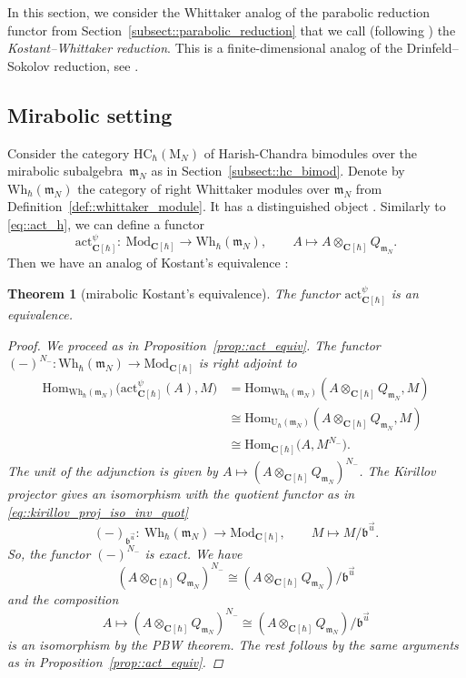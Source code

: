 \documentclass[10pt,a4paper]{article}
\numberwithin{equation}{section}
\newtheorem{Theorem}{Theorem}[section]
\newcommand{\C}{\mathbf{C}}
\newcommand{\U}{\mathrm{U}_{\hbar}}
\newcommand{\rM}{\mathrm{M}}
\renewcommand{\b}{\mathfrak{b}}
\newcommand{\n}{\mathfrak{n}}
\newcommand{\m}{\mathfrak{m}}
\newcommand{\Wh}{\mathrm{Wh}_{\hbar}}
\newcommand{\act}{\mathrm{act}}
\newcommand{\Mod}[1]{{\mathrm{Mod}}_{#1}}
\newcommand{\HC}{\mathrm{HC}_{\hbar}}
\newcommand{\Hom}{\mathrm{Hom}}
\begin{document}
	In this section, we consider the Whittaker analog of the parabolic reduction functor from Section~\ref{subsect::parabolic_reduction} that we call (following \cite{BezrukavnikovFinkelberg}) the \emph{Kostant--Whittaker reduction}. This is a finite-dimensional analog of the Drinfeld--Sokolov reduction, see \cite{Arakawa}.
	
	\subsection{Mirabolic setting} Consider the category $\HC(\rM_N)$ of Harish-Chandra bimodules over the mirabolic subalgebra~$\m_N$ as in Section~\ref{subsect::hc_bimod}. Denote by $\Wh(\m_N)$ the category of right Whittaker modules over $\m_N$ from Definition~\ref{def::whittaker_module}. It has a distinguished object \smash{$Q_{\m_N} = \n_-^{\psi} \backslash \U(\m_N)$}. Similarly to \eqref{eq::act_h}, we can define a functor
	\begin{equation*}
		\act_{\C[\hbar]}^{\psi} \colon\ \Mod{\C[\hbar]} \rightarrow \Wh(\m_N), \qquad A \mapsto A \otimes_{\C[\hbar]} Q_{\m_N}.
	\end{equation*}
	Then we have an analog of Kostant's equivalence \cite{Kostant}:
	\begin{Theorem}[mirabolic Kostant's equivalence]
		\label{thm::mirabolic_skryabin}
		The functor $\act_{\C[\hbar]}^{\psi}$ is an equivalence.
		\begin{proof}
			We proceed as in Proposition~\ref{prop::act_equiv}. The functor $(-)^{N_-} \colon \Wh(\m_N) \rightarrow \Mod{\C[\hbar]}$ is right adjoint to \smash{$\act_{\C[\hbar]}^{\psi}$}
			\begin{align*}
				\Hom_{\Wh(\m_N)} \bigl(\act_{\C[\hbar]}^{\psi}(A), M\bigr) &= \Hom_{\Wh(\m_N)}(A \otimes_{\C[\hbar]} Q_{\m_N},M) \\
				&\cong \Hom_{\U(\m_N)} (A \otimes_{\C[\hbar]} Q_{\m_N},M) \\
				&\cong \Hom_{\C[\hbar]}\bigl(A,M^{N_-}\bigr).
			\end{align*}
			The unit of the adjunction is given by
$
			A \mapsto (A \otimes_{\C[\hbar]} Q_{\m_N})^{N_-}$.
			The Kirillov projector gives an isomorphism with the quotient functor as in \eqref{eq::kirillov_proj_iso_inv_quot}
			\[
			(-)_{\b^{\vec{u}}}\colon\ \Wh(\m_N) \rightarrow \Mod{\C[\hbar]}, \qquad M \mapsto M/\b^{\vec{u}}.
			\]
			So, the functor $(-)^{N_-}$ is exact. We have
			\[
			(A \otimes_{\C[\hbar]} Q_{\m_N})^{N_-} \cong (A \otimes_{\C[\hbar]} Q_{\m_N})/ \b^{\vec{u}}
			\]
			and the composition
			\[
			A \mapsto (A \otimes_{\C[\hbar]} Q_{\m_N})^{N_-} \cong (A \otimes_{\C[\hbar]} Q_{\m_N})/ \b^{\vec{u}}
			\]
			is an isomorphism by the PBW theorem. The rest follows by the same arguments as in Proposition~\ref{prop::act_equiv}.
		\end{proof}
	\end{Theorem}
	
\end{document}
